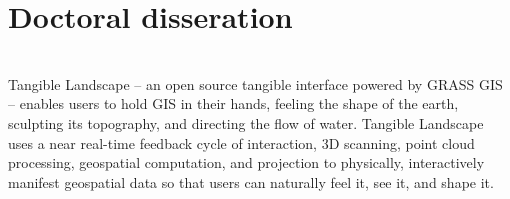 \documentclass[]{baharmon_cv}
\begin{document}
{{{{{\sectiondivider




\section{Doctoral disseration}
\vspace*{0.1cm}
\\ 
\vspace*{0.2cm}
%
Tangible Landscape -- an open source tangible interface powered by GRASS GIS -- 
enables users to hold GIS in their hands, feeling the shape of the earth, sculpting its topography, and directing the flow of water. 
%
Tangible Landscape uses a near real-time feedback cycle of interaction, 3D scanning, point cloud processing, geospatial computation, and projection to physically, interactively manifest geospatial data so that users can naturally feel it, see it, and shape it. 
%
\\

\sectiondivider


}}}}}
\end{document}
